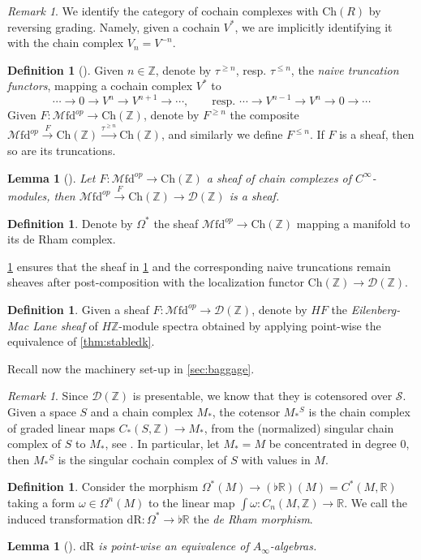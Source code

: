 \documentclass[10pt]{amsart}
\newcommand{\D}{\mathscr{D}}
\newcommand{\s}{\mathscr{S}}
\newcommand{\bR}{\mathbb{R}}
\newcommand{\bZ}{\mathbb{Z}}
\newcommand{\Ch}{\mathrm{Ch}}
\newcommand{\Mfd}{\mathscr{M}\mathrm{fd}}
\newcommand{\dr}{\mathrm{dR}}
\newtheorem{lemma}[equation]{Lemma}
\theoremstyle{definition}
\newtheorem{definition}[equation]{Definition}
\theoremstyle{remark}
\newtheorem{remark}[equation]{Remark}
\numberwithin{equation}{section}
\begin{document}
\begin{remark}\label{rmk:identification}
  We identify the category of cochain complexes with $\Ch(R)$ by reversing grading. Namely, given a cochain $V^*$, we are implicitly identifying it with the chain complex $V_n=V^{-n}$. 
\end{remark}
\begin{definition}[{\cite[Definition 7.14]{bunkenikolausvoelkl2016diffcoh}}]Given $n\in\bZ$, denote by $\tau^{\geq n}$, resp. $\tau^{\leq n}$, the \emph{naive truncation functors}, mapping a cochain complex $V^*$ to \[\cdots\to0\to V^n\to V^{n+1}\to\cdots, \qquad \mbox{resp. }\cdots\to V^{n-1}\to V^n\to0\to\cdots\]Given $F:\Mfd^{op}\to\Ch(\bZ)$, denote by $F^{\geq n}$ the composite $\Mfd^{op}\xrightarrow{F}\Ch(\bZ)\xrightarrow{\tau^{\geq n}}\Ch(\bZ)$, and similarly we define $F^{\leq n}$. If $F$ is a sheaf, then so are its truncations. 
\end{definition}
\begin{lemma}[{\cite[Lemma 7.12]{bunkenikolausvoelkl2016diffcoh}}]\label{lem:sheafloc}
  Let $F:\Mfd^{op}\to\Ch(\bZ)$ a sheaf of chain complexes of $C^\infty$-modules, then $\Mfd^{op}\xrightarrow{F}\Ch(\bZ)\to\D(\bZ)$ is a sheaf. 
\end{lemma}
\begin{definition}\label{def:forms}
  Denote by $\Omega^*$ the sheaf $\Mfd^{op}\to\Ch(\bZ)$ mapping a manifold to its de Rham complex. 
\end{definition}
\cref{lem:sheafloc} ensures that the sheaf in \cref{def:forms} and the corresponding naive truncations remain sheaves after post-composition with the localization functor $\Ch(\bZ)\to\D(\bZ)$.  
\begin{definition}\label{def:EMsheaf}
  Given a sheaf $F:\Mfd^{op}\to\D(\bZ)$, denote by $HF$ the \emph{Eilenberg-Mac Lane sheaf} of $H\bZ$-module spectra obtained by applying point-wise the equivalence of \cref{thm:stabledk}. 
\end{definition}
Recall now the machinery set-up in \cref{sec:baggage}.
\begin{remark}\label{rmk:Dcotensor}
  Since $\D(\bZ)$ is presentable, we know that they is cotensored over $\s$. Given a space $S$ and a chain complex $M_*$, the cotensor $M_*{}^S$ is the chain complex of graded linear maps $C_*(S,\bZ)\to M_*$, from the (normalized) singular chain complex of $S$ to $M_*$, see \cite[Definition 1.3.2.1]{lurie2017ha}. In particular, let $M_*=M$ be concentrated in degree 0, then $M_*{}^S$ is the singular cochain complex of $S$ with values in $M$. 
\end{remark}
\begin{definition}\label{def:derhammorf}
Consider the morphism $\Omega^*(M)\to (\flat\bR)(M)=C^*(M,\bR)$ taking a form $\omega\in\Omega^n(M)$ to the linear map $\int\omega:C_{n}(M,\bZ)\to\bR$. We call the induced transformation $\dr:\Omega^*\to\flat\bR$ the \emph{de Rham morphism}.  
\end{definition}
\begin{lemma}[{\cite[Theorem 3.25]{abad2010ainftyrhamtheoremintegration}}]\label{lem:derham} $\dr$ is point-wise an equivalence of $A_\infty$-algebras.
\end{lemma}
\end{document}
